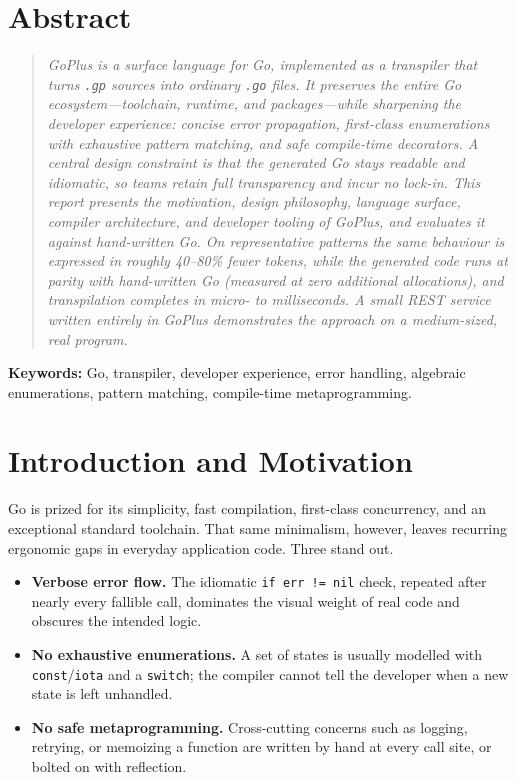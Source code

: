 \documentclass[11pt,a4paper]{article}
\begin{document}
\section*{\centering\color{hustred} Abstract}
\begin{quote}\itshape
GoPlus is a surface language for Go, implemented as a transpiler that turns
\texttt{.gp} sources into ordinary \texttt{.go} files. It preserves the entire Go
ecosystem---toolchain, runtime, and packages---while sharpening the developer
experience: concise error propagation, first-class enumerations with exhaustive
pattern matching, and safe compile-time decorators. A central design constraint
is that the generated Go stays readable and idiomatic, so teams retain full
transparency and incur no lock-in. This report presents the motivation, design
philosophy, language surface, compiler architecture, and developer tooling of
GoPlus, and evaluates it against hand-written Go. On representative patterns the
same behaviour is expressed in roughly 40--80\% fewer tokens, while the generated
code runs at parity with hand-written Go (measured at zero additional
allocations), and transpilation completes in micro- to milliseconds. A small
REST service written entirely in GoPlus demonstrates the approach on a
medium-sized, real program.
\end{quote}
\vspace{0.5em}
\noindent\textbf{Keywords:} Go, transpiler, developer experience, error handling,
algebraic enumerations, pattern matching, compile-time metaprogramming.

\vspace{1.5em}
{\color{hustred}\hrulefill}
\tableofcontents
\vspace{1em}
{\color{hustred}\hrulefill}
\clearpage
{}

\section{Introduction and Motivation}
Go is prized for its simplicity, fast compilation, first-class concurrency, and
an exceptional standard toolchain. That same minimalism, however, leaves
recurring ergonomic gaps in everyday application code. Three stand out.

\begin{itemize}[leftmargin=1.4em,itemsep=0.2em]
  \item \textbf{Verbose error flow.} The idiomatic \texttt{if err != nil} check,
        repeated after nearly every fallible call, dominates the visual weight of
        real code and obscures the intended logic.
  \item \textbf{No exhaustive enumerations.} A set of states is usually modelled
        with \texttt{const}/\texttt{iota} and a \texttt{switch}; the compiler
        cannot tell the developer when a new state is left unhandled.
  \item \textbf{No safe metaprogramming.} Cross-cutting concerns such as
        logging, retrying, or memoizing a function are written by hand at every
        call site, or bolted on with reflection.
\end{itemize}
\end{document}
